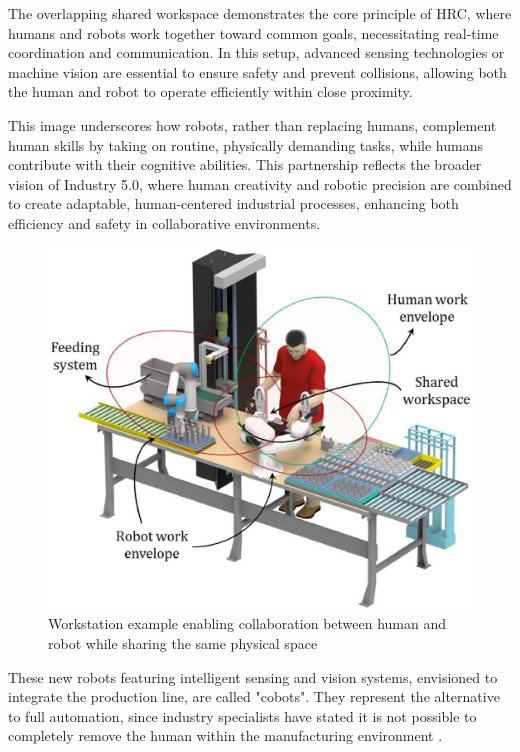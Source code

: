 The overlapping shared workspace demonstrates the core principle of \ac{HRC}, where humans and robots work together toward common goals, necessitating real-time coordination and communication. In this setup, advanced sensing technologies or machine vision are essential to ensure safety and prevent collisions, allowing both the human and robot to operate efficiently within close proximity.

This image underscores how robots, rather than replacing humans, complement human skills by taking on routine, physically demanding tasks, while humans contribute with their cognitive abilities. This partnership reflects the broader vision of Industry 5.0, where human creativity and robotic precision are combined to create adaptable, human-centered industrial processes, enhancing both efficiency and safety in collaborative environments.

\begin{figure}[!htbp]
    \centering
    \includegraphics[width=0.55\linewidth]{figs/workspace-station-high-res-image.jpg}
    \caption{Workstation example enabling collaboration between human and robot while sharing the same physical space~\cite{MALIK2021102092}} 
    \label{fig:hrc-workstation}
\end{figure} 


These new robots featuring intelligent sensing and vision systems, envisioned to integrate the production line, are called "cobots". 
They represent the alternative to full automation, since industry specialists have stated it is not possible to completely remove the 
human within the manufacturing environment \cite{Weiss2021}.



